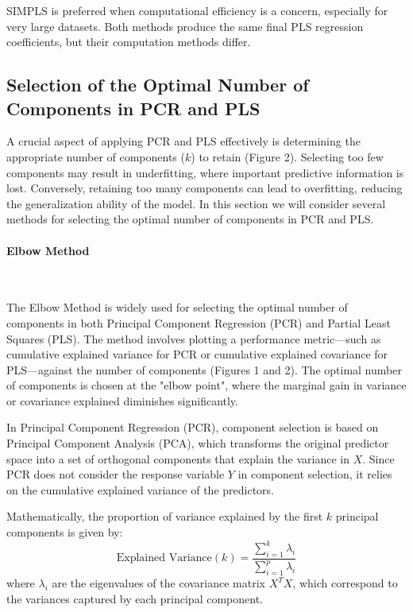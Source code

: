 \documentclass[11pt,twoside,a4paper]{article}
\begin{document}
SIMPLS is preferred when computational efficiency is a concern, especially for very large datasets. Both methods produce the same final PLS regression coefficients, but their computation methods differ.

\subsection{Selection of the Optimal Number of Components in PCR and PLS}
A crucial aspect of applying PCR and PLS effectively is determining the appropriate number of components (\( k \)) to retain (Figure 2). Selecting too few components may result in underfitting, where important predictive information is lost. Conversely, retaining too many components can lead to overfitting, reducing the generalization ability of the model. In this section we will consider several methods for selecting the optimal number of components in PCR and PLS.

\paragraph {Elbow Method} \ \

The Elbow Method is widely used for selecting the optimal number of components in both Principal Component Regression (PCR) and Partial Least Squares (PLS). The method involves plotting a performance metric—such as cumulative explained variance for PCR or cumulative explained covariance for PLS—against the number of components (Figures 1 and 2). The optimal number of components is chosen at the "elbow point", where the marginal gain in variance or covariance explained diminishes significantly.

In Principal Component Regression (PCR), component selection is based on Principal Component Analysis (PCA), which transforms the original predictor space into a set of orthogonal components that explain the variance in \( X \). Since PCR does not consider the response variable \( Y \) in component selection, it relies on the cumulative explained variance of the predictors.

Mathematically, the proportion of variance explained by the first \( k \) principal components is given by:
\begin{equation}
\text{Explained Variance}(k) = \frac{\sum_{i=1}^{k} \lambda_i}{\sum_{i=1}^{p} \lambda_i}
\end{equation}
where \( \lambda_i \) are the eigenvalues of the covariance matrix \( X^T X \), which correspond to the variances captured by each principal component.
\end{document}
